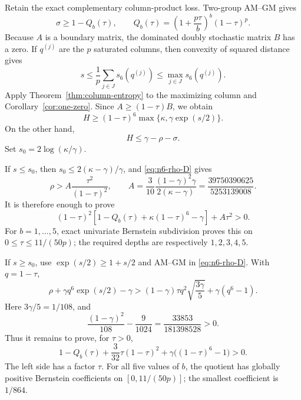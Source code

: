 \documentclass[11pt]{article}
\theoremstyle{definition}
\newcommand{\1}{\mathbf{1}}
\begin{document}
Retain the exact complementary column-product loss.  Two-group AM--GM gives
\begin{equation}\label{eq:n6-sigma-exact}
 \sigma\ge1-Q_b(\tau),
 \qquad
 Q_b(\tau)=
 \left(1+\frac{p\tau}{b}\right)^b(1-\tau)^p.
\end{equation}
Because $A$ is a boundary matrix, the dominated doubly stochastic matrix
$B$ has a zero.  If $q^{(j)}$ are the $p$ saturated columns, then convexity
of squared distance gives
\[
 s\le\frac1p\sum_{j\in J}s_6(q^{(j)})
 \le\max_{j\in J}s_6(q^{(j)}).
\]
Apply Theorem~\ref{thm:column-entropy} to the maximizing column and
Corollary~\ref{cor:one-zero}.  Since $A\ge(1-\tau)B$, we obtain
\begin{equation}\label{eq:n6-one-sided-per-lower}
 H\ge(1-\tau)^6\max\{\kappa,\gamma\exp(s/2)\}.
\end{equation}
On the other hand,
\begin{equation}\label{eq:n6-one-sided-per-upper}
 H\le\gamma-\rho-\sigma.
\end{equation}
Set $s_0=2\log(\kappa/\gamma)$.

If $s\le s_0$, then
$s_0\le2(\kappa-\gamma)/\gamma$, and
\eqref{eq:n6-rho-D} gives
\begin{equation}\label{eq:n6-Aenergy}
 \rho>A\frac{\tau^2}{(1-\tau)^2},
 \qquad
 A=\frac{3}{10}\frac{(1-\gamma)^2\gamma}{2(\kappa-\gamma)}
 =\frac{39750390625}{5253139008}.
\end{equation}
It is therefore enough to prove
\begin{equation}\label{eq:n6-small-poly}
 (1-\tau)^2
 \left[1-Q_b(\tau)+\kappa(1-\tau)^6-\gamma\right]
 +A\tau^2>0.
\end{equation}
For $b=1,\dots,5$, exact univariate Bernstein subdivision proves this on
$0\le\tau\le11/(50p)$; the required depths are respectively
$1,2,3,4,5$.

If $s\ge s_0$, use $\exp(s/2)\ge1+s/2$ and AM--GM in
\eqref{eq:n6-rho-D}.  With $q=1-\tau$,
\[
 \rho+\gamma q^6\exp(s/2)-\gamma
 >(1-\gamma)\tau q^2\sqrt{\frac{3\gamma}{5}}
   +\gamma(q^6-1).
\]
Here $3\gamma/5=1/108$, and
\begin{equation}\label{eq:n6-large-gap}
 \frac{(1-\gamma)^2}{108}-\frac9{1024}
 =\frac{33853}{181398528}>0.
\end{equation}
Thus it remains to prove, for $\tau>0$,
\begin{equation}\label{eq:n6-large-poly}
 1-Q_b(\tau)+\frac3{32}\tau(1-\tau)^2
 +\gamma\bigl((1-\tau)^6-1\bigr)>0.
\end{equation}
The left side has a factor $\tau$.  For all five values of $b$, the quotient
has globally positive Bernstein coefficients on $[0,11/(50p)]$; the
smallest coefficient is $1/864$.
\end{document}
